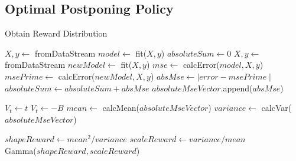 \documentclass{mpaper}
\begin{document}
\begin{appendix}
\section{Optimal Postponing Policy}\label{rewarddist}
\begin{algorithm}[h]
\caption{Obtain Reward Distribution}
\begin{algorithmic}
    \State $X, y \gets$ fromDataStream
    \State $model \gets$ fit($X,y$)
    \State $absoluteSum \gets 0$
        \State $X, y \gets$ fromDataStream
        \State $newModel \gets$ fit($X,y$)
        \State $mse \gets$ calcError($model,X,y$)
        \State $msePrime \gets$ calcError($newModel,X,y$)
        \State $absMse \gets \mid error - msePrime \mid$
        \State $absoluteSum \gets absoluteSum + absMse$
        \State $absoluteMseVector$.append($absMse$)
        
            \State $V_t \gets t$
        \Else
            \State $V_t \gets -B$
        \EndIf
    \EndFor
    \State $mean \gets$ calcMean($absoluteMseVector$)
    \State $variance \gets$ calcVar($absoluteMseVector$)
    
    \State $shapeReward \gets mean^2/variance$
    \State $scaleReward \gets variance/mean$\\
    \Return Gamma($shapeReward, scaleReward$)
    
\EndFunction
\end{algorithmic}
\end{algorithm}

\end{appendix}
\end{document}
